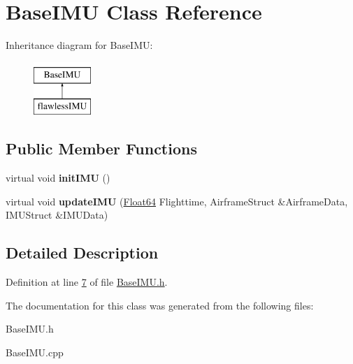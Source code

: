 \hypertarget{class_base_i_m_u}{}\section{Base\+I\+MU Class Reference}
\label{class_base_i_m_u}
Inheritance diagram for Base\+I\+MU\+:\begin{figure}[H]
\begin{center}
\leavevmode
\includegraphics[height=2.000000cm]{class_base_i_m_u}
\end{center}
\end{figure}
\subsection*{Public Member Functions}
\begin{DoxyCompactItemize}
\item 
\mbox{\label{class_base_i_m_u_a7eb2941704948f482418ce0ae0adcfbc}} 
virtual void {\bfseries init\+I\+MU} ()
\item 
\mbox{\label{class_base_i_m_u_aebc4d2544857969fe7c37f7a3ef91616}} 
virtual void {\bfseries update\+I\+MU} (\hyperlink{group___tools_ga3f1431cb9f76da10f59246d1d743dc2c}{Float64} Flighttime, Airframe\+Struct \&Airframe\+Data, I\+M\+U\+Struct \&I\+M\+U\+Data)
\end{DoxyCompactItemize}


\subsection{Detailed Description}


Definition at line \hyperlink{_base_i_m_u_8h_source_l00007}{7} of file \hyperlink{_base_i_m_u_8h_source}{Base\+I\+M\+U.\+h}.



The documentation for this class was generated from the following files\+:\begin{DoxyCompactItemize}
\item 
Base\+I\+M\+U.\+h\item 
Base\+I\+M\+U.\+cpp\end{DoxyCompactItemize}
